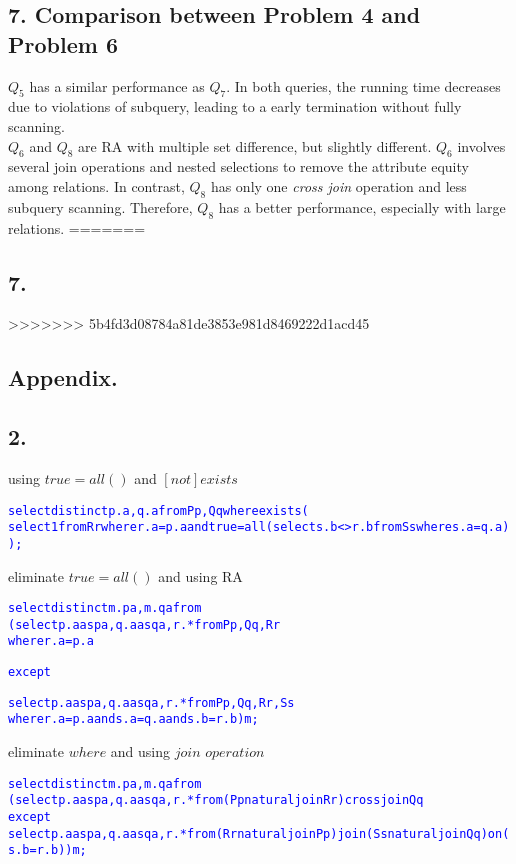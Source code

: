 \documentclass[10pt]{article}
\begin{document}
\subsection*{7. Comparison between Problem 4 and Problem 6}
$Q_5$ has a similar performance as $Q_7$. In both queries, the running time decreases due to violations of subquery, leading to a early termination without fully scanning.\\
$Q_6$ and $Q_8$ are RA with multiple set difference, but slightly different. $Q_6$ involves several join operations and nested selections to remove the attribute equity among relations. In contrast, $Q_8$ has only one \textit{cross join} operation and less subquery scanning. Therefore, $Q_8$ has a better performance, especially with large relations. 
=======
\subsection*{7.}

>>>>>>> 5b4fd3d08784a81de3853e981d8469222d1acd45
\newpage
\subsection*{Appendix.} 

\subsection*{2.}


using $true = all()$ and $ [not] exists $ 
{
\begin{alltt}\textcolor{blue}{

select distinct p.a, q.a from P p, Q q where exists(
	select 1 from R r where r.a = p.a and true = all(select s.b <> r.b from S s where s.a = q.a));
}
\end{alltt}
}



eliminate $true = all()$ and using RA
{
\begin{alltt}\textcolor{blue}{
select distinct m.pa, m.qa from
    (select p.a as pa , q.a as qa, r.* from P p, Q q, R r
    where r.a = p.a
    
except 

select p.a as pa, q.a as qa, r.* from P p, Q q, R r, S s
    where r.a = p.a and s.a = q.a and s.b = r.b) m;}
\end{alltt}
}



eliminate $where$ and using $join$ $ operation$
{
\begin{alltt}\textcolor{blue}{

select distinct m.pa, m.qa from
(select p.a as pa , q.a as qa, r.* from (P p natural join R r) cross join Q q
except 
select p.a as pa, q.a as qa, r.* from (R r natural join P p) join (S s natural join Q q) on (s.b = r.b)) m;
}
\end{alltt}
}
\end{document}

